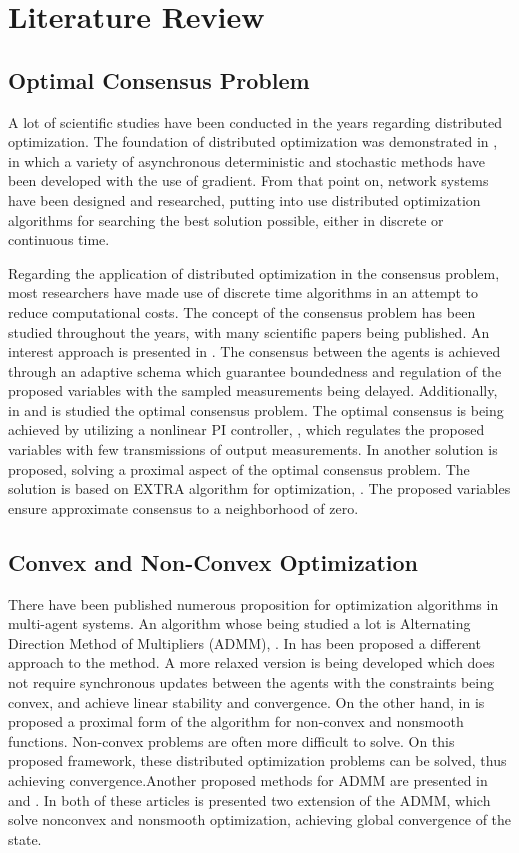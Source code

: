 \section{Literature Review}

\subsection{Optimal Consensus Problem}
    A lot of scientific studies have been conducted in the years regarding distributed optimization. The foundation of distributed optimization was demonstrated in \cite{1104412}, in which a variety of asynchronous deterministic and stochastic methods have been developed with the use of gradient. From that point on, network systems have been designed and researched, putting into use distributed optimization algorithms for searching the best solution possible, either in discrete or continuous time.

    Regarding the application of distributed optimization in the consensus problem, most researchers have made use of discrete time algorithms in an attempt to reduce computational costs. The concept of the consensus problem has been studied throughout the years, with many scientific papers being published. An interest approach is presented in \cite{9162430}. The consensus between the agents is achieved through an adaptive schema which guarantee boundedness and regulation of the proposed variables with the sampled measurements being delayed. Additionally, in \cite{9785920} and \cite{9477076} is studied the optimal consensus problem. The optimal consensus is being achieved by utilizing a nonlinear PI controller, \cite{PSILLAKIS201911581}, which regulates the proposed variables with few transmissions of output measurements. In \cite{10125000} another solution is proposed, solving a proximal aspect of the optimal consensus problem. The solution is based on EXTRA algorithm for optimization, \cite{ShiEXTRA15}. The proposed variables ensure approximate consensus to a neighborhood of zero. 

\subsection{Convex and Non-Convex Optimization}
    There have been published numerous proposition for optimization algorithms in multi-agent systems. An algorithm whose being studied a lot is Alternating Direction Method of Multipliers (ADMM), \cite{10.1561/2200000016}. In \cite{9146334} has been proposed a different approach to the method. A more relaxed version is being developed which does not require synchronous updates between the agents with the constraints being convex, and achieve linear stability and convergence. On the other hand, in \cite{YANG2022110551} is proposed a proximal form of the algorithm for non-convex and nonsmooth functions. Non-convex problems are often more difficult to solve. On this proposed framework, these distributed optimization problems can be solved, thus achieving convergence.Another proposed methods for ADMM are presented in \cite{8704712} and \cite{wang2018global}. In both of these articles is presented two extension of the ADMM, which solve nonconvex and nonsmooth optimization, achieving global convergence of the state.

